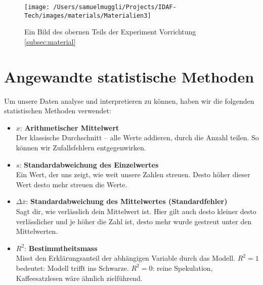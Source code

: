 \documentclass[../main.tex]{subfiles} %
\begin{document}
            \begin{figure}[H]
                \centering
                \texttt{[image: /Users/samuelmuggli/Projects/IDAF-Tech/images/materials/Materialien3]}
                \caption{Ein Bild des obernen Teils der Experiment Vorrichtung  \ref{subsec:material}}
                \label{fig:material3}
            \end{figure}

    \section{Angewandte statistische Methoden}\label{sec:angewandte-statistische-methoden}
        Um unsere Daten analyse und interpretieren zu können, haben wir die folgenden statistischen Methoden verwendet:
        \begin{itemize}
            \item $x$: \textbf{Arithmetischer Mittelwert} \\
            \quad Der klassische Durchschnitt – alle Werte addieren, durch die Anzahl teilen.
                  So können wir Zufallsfehlern entgegenwirken.

            \item $s$: \textbf{Standardabweichung des Einzelwertes} \\
            \quad Ein Wert, der uns zeigt, wie weit unsere Zahlen streuen.
                  Desto höher dieser Wert desto mehr streuen die Werte.

            \item $\Delta \bar{x}$: \textbf{Standardabweichung des Mittelwertes (Standardfehler)} \\
            \quad Sagt dir, wie verlässlich dein Mittelwert ist.
                  Hier gilt auch desto kleiner desto verlässlicher und je höher die Zahl ist, desto mehr wurde gestreut unter den Mittelwerten.

            \item $R^2$: \textbf{Bestimmtheitsmass} \\
            \quad Misst den Erklärungsanteil der abhängigen Variable durch das Modell. $R^2 = 1$ bedeutet: Modell trifft ins Schwarze. $R^2 = 0$: reine Spekulation, Kaffeesatzlesen wäre ähnlich zielführend.
        \end{itemize}
\end{document}
